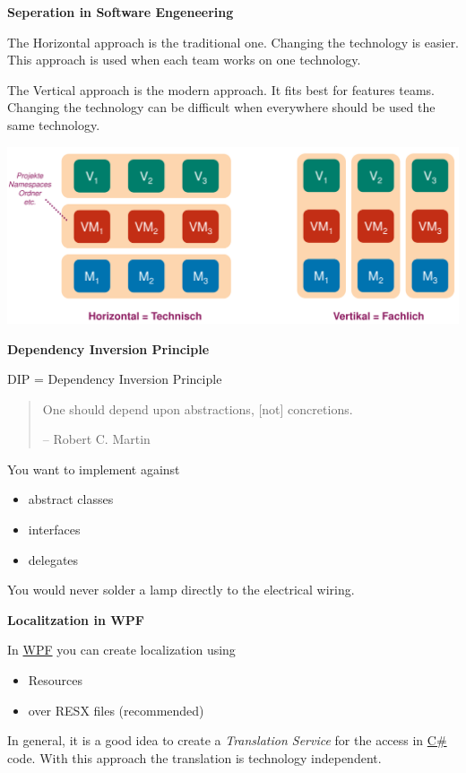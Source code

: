 \documentclass[10pt,twoside,landscape]{article}
\begin{document}
\begin{multicols}{3}
\textbf{Seperation in Software Engeneering}

The Horizontal approach is the traditional one.
Changing the technology is easier.
This approach is used when each team works on one technology.

The Vertical approach is the modern approach.
It fits best for features teams.
Changing the technology can be difficult when everywhere should be used the same technology.

\begin{center}
\includegraphics[width=.9\linewidth]{img/horizontal_vertical_cuts.png}
\end{center}

\textbf{Dependency Inversion Principle}

DIP = Dependency Inversion Principle

\begin{quote}
One should depend upon
abstractions, [not] concretions.

-- Robert C. Martin
\end{quote}

You want to implement against
\begin{itemize}
\item abstract classes
\item interfaces
\item delegates
\end{itemize}


You would never solder a lamp directly to the electrical wiring.

\textbf{Localitzation in WPF}

In \href{../../../roam/20211123162923-wpf.org}{WPF} you can create localization using
\begin{itemize}
\item Resources
\item over RESX files (recommended)
\end{itemize}


In general, it is a good idea to create a \emph{Translation Service} for the access in \href{../../../roam/20211003114158-c.org}{C\#} code.
With this approach the translation is technology independent.


\end{multicols}
\end{document}

